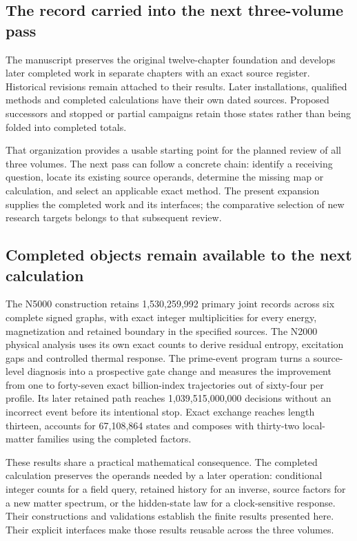 \subsection{The record carried into the next three-volume pass}

The manuscript preserves the original twelve-chapter foundation and develops later completed work in separate chapters with an exact source register. Historical revisions remain attached to their results. Later installations, qualified methods and completed calculations have their own dated sources. Proposed successors and stopped or partial campaigns retain those states rather than being folded into completed totals.

That organization provides a usable starting point for the planned review of all three volumes. The next pass can follow a concrete chain: identify a receiving question, locate its existing source operands, determine the missing map or calculation, and select an applicable exact method. The present expansion supplies the completed work and its interfaces; the comparative selection of new research targets belongs to that subsequent review.


\subsection{Completed objects remain available to the next calculation}

The N5000 construction retains 1,530,259,992 primary joint records across six complete signed graphs, with exact integer multiplicities for every energy, magnetization and retained boundary in the specified sources. The N2000 physical analysis uses its own exact counts to derive residual entropy, excitation gaps and controlled thermal response. The prime-event program turns a source-level diagnosis into a prospective gate change and measures the improvement from one to forty-seven exact billion-index trajectories out of sixty-four per profile. Its later retained path reaches 1,039,515,000,000 decisions without an incorrect event before its intentional stop. Exact exchange reaches length thirteen, accounts for 67,108,864 states and composes with thirty-two local-matter families using the completed factors.

These results share a practical mathematical consequence. The completed calculation preserves the operands needed by a later operation: conditional integer counts for a field query, retained history for an inverse, source factors for a new matter spectrum, or the hidden-state law for a clock-sensitive response. Their constructions and validations establish the finite results presented here. Their explicit interfaces make those results reusable across the three volumes.
